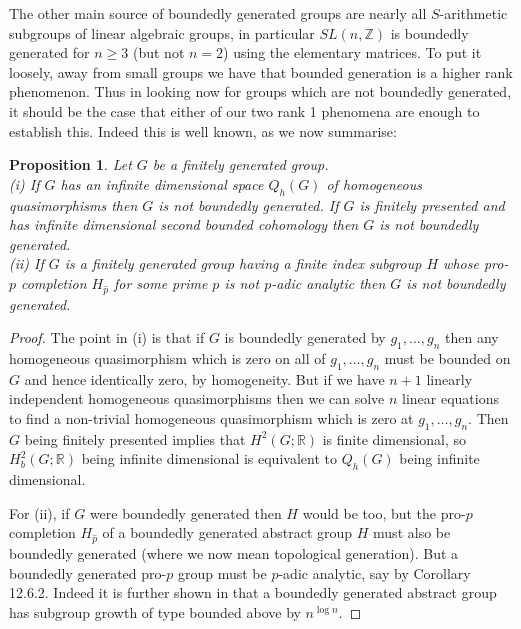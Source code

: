 \documentclass[11pt,reqno]{amsart}
\numberwithin{equation}{section}
\newcommand{\Z}{\mathbb{Z}}
\newcommand{\R}{\mathbb{R}}
\newtheorem{prop}[thm]{Proposition}
\theoremstyle{definition}
\theoremstyle{remark}
\begin{document}
The other main source of boundedly generated groups are nearly all
$S$-arithmetic subgroups of linear algebraic groups, in particular
$SL(n,\Z)$ is boundedly generated for $n\geq 3$ (but not $n=2$) using
the elementary matrices. To put it loosely, away from small groups
we have that bounded generation is a higher rank phenomenon. Thus
in looking now
for groups which are not boundedly generated, it should be the case that
either of our two rank 1 phenomena are enough to establish this. Indeed
this is well known, as we now summarise:
\begin{prop} \label{ntbg}
  Let $G$ be a finitely generated group.\\
  (i) If $G$ has an infinite dimensional
  space $Q_h(G)$ of homogeneous quasimorphisms then $G$ is not
  boundedly generated. If $G$ is finitely presented and has infinite
  dimensional second bounded cohomology then $G$ is not boundedly
  generated.\\
  (ii) If $G$ is a finitely generated group having a finite index subgroup
  $H$ whose pro-$p$ completion $H_{\hat{p}}$ for some prime $p$ is not
  $p$-adic analytic then $G$ is not boundedly generated.
\end{prop}
\begin{proof}
  The point in (i) is that if $G$ is boundedly generated by $g_1,\ldots ,g_n$
then any homogeneous quasimorphism which is zero on all of
$g_1,\ldots ,g_n$ must be bounded on $G$ and hence
identically zero, by homogeneity. But if we have
$n+1$ linearly independent homogeneous quasimorphisms then we can solve
$n$ linear equations to find a non-trivial homogeneous quasimorphism which
is zero at $g_1,\ldots ,g_n$. Then
$G$ being finitely presented implies that $H^2(G;\R)$ is finite dimensional,
so $H^2_b(G;\R)$ being infinite dimensional is equivalent to $Q_h(G)$
being infinite dimensional.

For (ii), if $G$ were boundedly generated then $H$ would be too, but
the pro-$p$ completion $H_{\hat{p}}$ of a boundedly generated abstract group
$H$ must also be boundedly generated (where we now mean topological
generation). But a boundedly generated pro-$p$ group must be $p$-adic
analytic, say by \cite{lssg} Corollary 12.6.2. Indeed it is further shown
in \cite{pyb} that a boundedly generated abstract group has subgroup
growth of type bounded above by $n^{\log{n}}$.
\end{proof}
\end{document}
